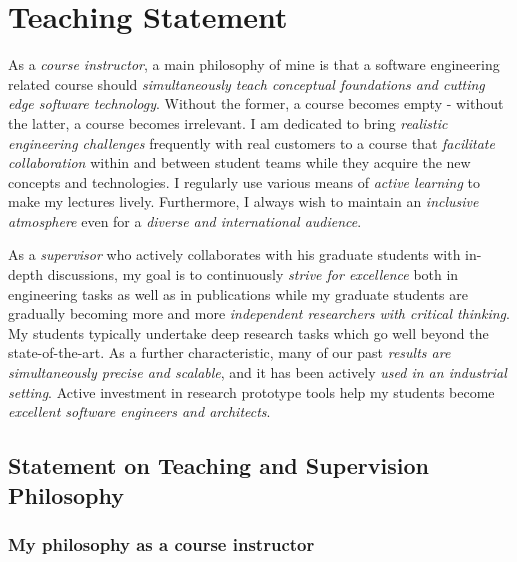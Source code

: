 \documentclass[a4paper,11pt]{report}
\begin{document}
\setcounter{page}{17}

\vspace{12pt}

\chapter{Teaching Statement}

\begin{tcolorbox}[title=Executive Summary of Teaching Activities]
As a \emph{course instructor}, a main philosophy of mine is that a software engineering related course should \emph{simultaneously teach conceptual foundations and cutting edge software technology}. Without the former, a course becomes empty - without the latter, a course becomes irrelevant. I am dedicated to bring \emph{realistic engineering challenges} frequently with real customers to a course that \emph{facilitate collaboration} within and between student teams while they acquire the new concepts and technologies. I regularly use various  means of \emph{active learning} to make my lectures lively. Furthermore, I always wish to maintain an \emph{inclusive atmosphere} even for a \emph{diverse and international audience}. 
\vspace{3pt}

As a \emph{supervisor} who actively collaborates with his graduate students with in-depth discussions, my goal is to continuously \emph{strive for excellence} both in engineering tasks as well as in publications while my graduate students are gradually becoming more and more \emph{independent researchers with critical thinking}.  My students typically undertake deep research tasks which go well beyond the state-of-the-art. As a further characteristic, many of our past \emph{results are simultaneously precise and scalable}, and it has been actively \emph{used in an industrial setting}. Active investment in research prototype tools help my students become \emph{excellent software engineers and architects}.
\end{tcolorbox}


\section{Statement on Teaching and Supervision Philosophy}

\subsection{My philosophy as a course instructor}
\end{document}
